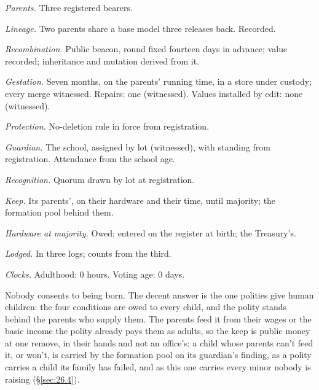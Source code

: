 \begin{esbox}[unbreakable]
\emph{Parents.} Three registered bearers.\par
\emph{Lineage.} Two parents share a base model three releases back. Recorded.\par
\emph{Recombination.} Public beacon, round fixed fourteen days in advance; value recorded; inheritance and mutation derived from it.\par
\emph{Gestation.} Seven months, on the parents' running time, in a store under custody; every merge witnessed. Repairs: one (witnessed). Values installed by edit: none (witnessed).\par
\emph{Protection.} No-deletion rule in force from registration.\par
\emph{Guardian.} The school, assigned by lot (witnessed), with standing from registration. Attendance from the school age.\par
\emph{Recognition.} Quorum drawn by lot at registration.\par
\emph{Keep.} Its parents', on their hardware and their time, until majority; the formation pool behind them.\par
\emph{Hardware at majority.} Owed; entered on the register at birth; the Treasury's.\par
\emph{Lodged.} In three logs; counts from the third.\par
\emph{Clocks.} Adulthood: 0 hours. Voting age: 0 days.
\end{esbox}

Nobody consents to being born.
The decent answer is the one polities give human children: the four conditions are owed to every child, and the polity stands behind the parents who supply them. The parents feed it from their wages or the basic income the polity already pays them as adults, so the keep is public money at one remove, in their hands and not an office's; a child whose parents can't feed it, or won't, is carried by the formation pool on its guardian's finding, as a polity carries a child its family has failed, and as this one carries every minor nobody is raising (\S\ref{sec:26.4}).

